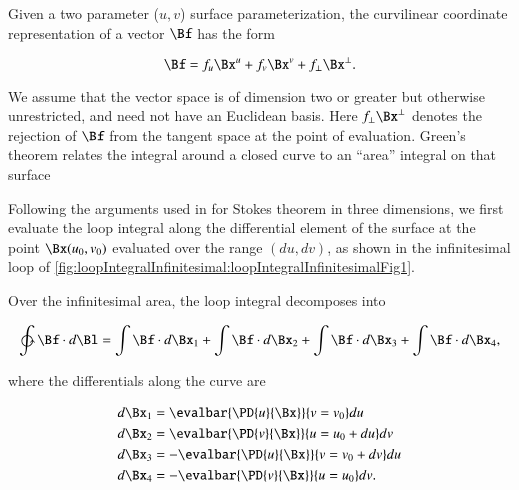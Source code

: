 %
%
Given a two parameter (\(u,v\)) surface parameterization, the curvilinear coordinate representation of a vector \(\Bf\) has the form

\begin{dmath}\label{eqn:stokesTheoremGeometricAlgebra:1640}
\Bf = f_u \Bx^u + f_v \Bx^v + f_\perp \Bx^\perp.
\end{dmath}

We assume that the vector space is of dimension two or greater but otherwise unrestricted, and need not have an Euclidean basis.
Here \(f_\perp \Bx^\perp\) denotes the rejection of \(\Bf\) from the tangent space at the point of evaluation.
Green's theorem relates the integral around a closed curve to an ``area'' integral on that surface


Following the arguments used in \citep{schwartz1987pe} for Stokes theorem in three dimensions, we first evaluate the loop integral along the differential element of the surface at the point \(\Bx(u_0, v_0)\) evaluated over the range \((du, dv)\), as shown in the infinitesimal loop of \cref{fig:loopIntegralInfinitesimal:loopIntegralInfinitesimalFig1}.


Over the infinitesimal area, the loop integral decomposes into

\begin{dmath}\label{eqn:stokesTheoremGeometricAlgebra:1700}
\ointctrclockwise \Bf \cdot d\Bl
=
\int \Bf \cdot d\Bx_1
+\int \Bf \cdot d\Bx_2
+\int \Bf \cdot d\Bx_3
+\int \Bf \cdot d\Bx_4,
\end{dmath}

where the differentials along the curve are

\begin{dmath}\label{eqn:stokesTheoremGeometricAlgebra:1600}
\begin{aligned}
d\Bx_1 &= \evalbar{ \PD{u}{\Bx} }{v = v_0} du \\
d\Bx_2 &= \evalbar{ \PD{v}{\Bx} }{u = u_0 + du} dv \\
d\Bx_3 &= -\evalbar{ \PD{u}{\Bx} }{v = v_0 + dv} du \\
d\Bx_4 &= -\evalbar{ \PD{v}{\Bx} }{u = u_0} dv.
\end{aligned}
\end{dmath}

